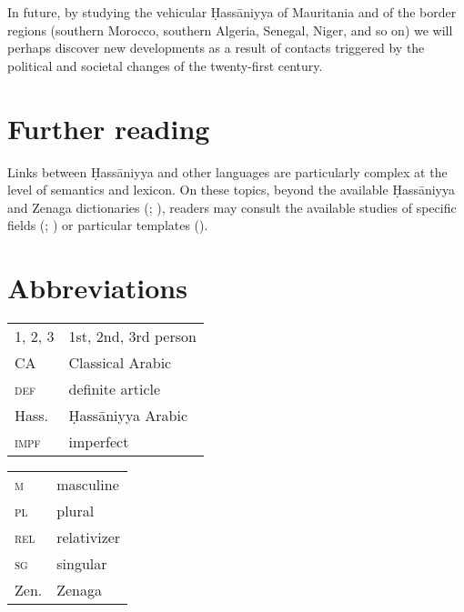 \documentclass[output=paper]{langsci/langscibook}
\begin{document}
In future, by studying the vehicular Ḥassāniyya of Mauritania and of the border regions (southern Morocco, southern Algeria, Senegal, Niger, and so on) we will perhaps discover new developments as a result of contacts triggered by the political and societal changes of the twenty-first century. 

\section*{Further reading}

Links between Ḥassāniyya and other languages are particularly complex at the level of semantics and lexicon. On these topics, beyond the available Ḥassāniyya and Zenaga dictionaries (\citealt{Heath2004}; \citealt{Taine-Cheikh1988dictionary,Taine-Cheikh2008dictionary}), readers may consult the available studies of specific fields (\citealt{Monteil1952}; \citealt{Taine-Cheikh2013}) or particular templates (\citealt{Taine-Cheikh2018quadri}).

\section*{Abbreviations}
\begin{tabularx}{.5\textwidth}{@{}lQ@{}}
\textsc{1, 2, 3} & 1st, 2nd, 3rd person \\
CA           & Classical Arabic \\
\textsc{def}     & definite article \\
Hass.           & Ḥassāniyya Arabic \\
\textsc{impf}   & imperfect \\
\end{tabularx}%
\begin{tabularx}{.5\textwidth}{@{}lQ@{}}
\textsc{m}   & masculine\\
\textsc{pl}  & plural\\
\textsc{rel}     & relativizer\\
\textsc{sg}  & singular \\
Zen. & Zenaga
\end{tabularx}%
 

\sloppy
\printbibliography[heading=subbibliography,notkeyword=this]
\end{document}
